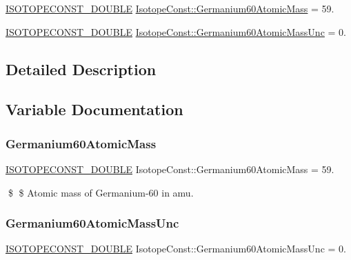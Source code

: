 \begin{DoxyCompactItemize}
\item 
\mbox{\hyperlink{group___isotope_const-_macros_ga8f45a7272ce02c0b4c65c44636ed719a}{I\+S\+O\+T\+O\+P\+E\+C\+O\+N\+S\+T\+\_\+\+D\+O\+U\+B\+LE}} \mbox{\hyperlink{group___isotope_const-_germanium-_ge60_ga25dd5d496b61081047671ef323e9c8f3}{Isotope\+Const\+::\+Germanium60\+Atomic\+Mass}} = 59.
\item 
\mbox{\hyperlink{group___isotope_const-_macros_ga8f45a7272ce02c0b4c65c44636ed719a}{I\+S\+O\+T\+O\+P\+E\+C\+O\+N\+S\+T\+\_\+\+D\+O\+U\+B\+LE}} \mbox{\hyperlink{group___isotope_const-_germanium-_ge60_gaf98cf1dc68a6c4f6f5dec49fcf1cd68f}{Isotope\+Const\+::\+Germanium60\+Atomic\+Mass\+Unc}} = 0.
\end{DoxyCompactItemize}


\subsection{Detailed Description}


\subsection{Variable Documentation}
\mbox{\label{group___isotope_const-_germanium-_ge60_ga25dd5d496b61081047671ef323e9c8f3}} 
\subsubsection{\texorpdfstring{Germanium60\+Atomic\+Mass}{Germanium60AtomicMass}}
{\footnotesize\ttfamily \mbox{\hyperlink{group___isotope_const-_macros_ga8f45a7272ce02c0b4c65c44636ed719a}{I\+S\+O\+T\+O\+P\+E\+C\+O\+N\+S\+T\+\_\+\+D\+O\+U\+B\+LE}} Isotope\+Const\+::\+Germanium60\+Atomic\+Mass = 59.}

\$ \$ Atomic mass of Germanium-\/60 in amu. \mbox{\label{group___isotope_const-_germanium-_ge60_gaf98cf1dc68a6c4f6f5dec49fcf1cd68f}} 
\subsubsection{\texorpdfstring{Germanium60\+Atomic\+Mass\+Unc}{Germanium60AtomicMassUnc}}
{\footnotesize\ttfamily \mbox{\hyperlink{group___isotope_const-_macros_ga8f45a7272ce02c0b4c65c44636ed719a}{I\+S\+O\+T\+O\+P\+E\+C\+O\+N\+S\+T\+\_\+\+D\+O\+U\+B\+LE}} Isotope\+Const\+::\+Germanium60\+Atomic\+Mass\+Unc = 0.}

